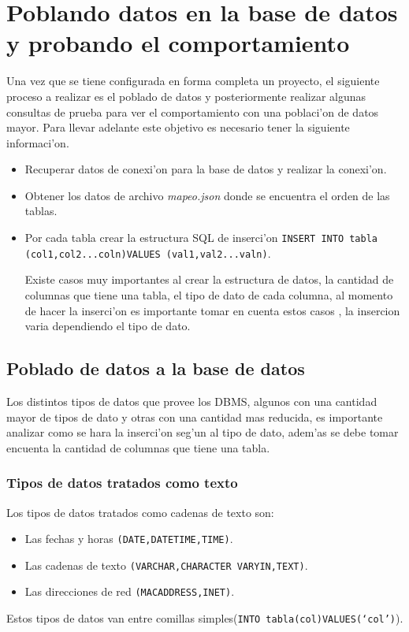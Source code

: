 \chapter{Poblando datos en la base de datos y probando el comportamiento}
Una vez que se tiene configurada en forma completa un proyecto, el siguiente proceso a realizar es el poblado de datos y posteriormente realizar algunas consultas de prueba para ver el comportamiento con una poblaci'on de datos mayor. Para llevar adelante este objetivo es necesario tener la siguiente informaci'on. 
\begin{itemize}
\item Recuperar datos de conexi'on para la base de datos y realizar la conexi'on.
\item Obtener los datos de archivo \textit{mapeo.json} donde se encuentra el orden de las tablas.
\item Por cada tabla crear la estructura SQL de inserci'on \texttt{INSERT INTO tabla (col1,col2...coln)VALUES (val1,val2...valn)}.

Existe casos muy importantes al crear la estructura de datos, la cantidad de columnas que tiene una tabla, el tipo de dato de cada columna, al momento de hacer la inserci'on es importante tomar en cuenta estos casos , la insercion varia dependiendo el tipo de dato.   
\end{itemize} 
\section{Poblado de datos a la base de datos}
Los distintos tipos de datos que provee los DBMS, algunos con una cantidad mayor de tipos de dato y otras con una cantidad mas reducida, es importante analizar como se hara la inserci'on seg'un al tipo de dato, adem'as se debe tomar encuenta la cantidad de columnas que tiene una tabla.
\subsection{Tipos de datos tratados como texto}
Los tipos de datos tratados como cadenas de texto son:
\begin{itemize}
\item Las fechas y horas \texttt{(DATE,DATETIME,TIME)}.
\item Las cadenas de texto \texttt{(VARCHAR,CHARACTER VARYIN,TEXT)}.
\item Las direcciones de red \texttt{(MACADDRESS,INET)}.
\end{itemize}
Estos tipos de datos van entre comillas simples(\texttt{INTO tabla(col)VALUES(`col')}).
